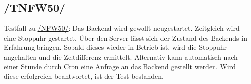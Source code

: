 \subsection*{/TNFW50/}

\label{/TNFW50/} Testfall zu \hyperref[/NFW50/]{/NFW50/}: Das \Gls{Backend} wird gewollt neugestartet. Zeitgleich wird eine Stoppuhr gestartet.
Über den \Gls{Server} lässt sich der Zustand des \Gls{Backend}s in Erfahrung bringen.
Sobald dieses wieder in Betrieb ist, wird die Stoppuhr angehalten und die Zeitdifferenz ermittelt.
Alternativ kann automatisch nach einer Stunde durch \Gls{Cron} eine Anfrage an das \Gls{Backend} gestellt werden.
Wird diese erfolgreich beantwortet, ist der Test bestanden.
